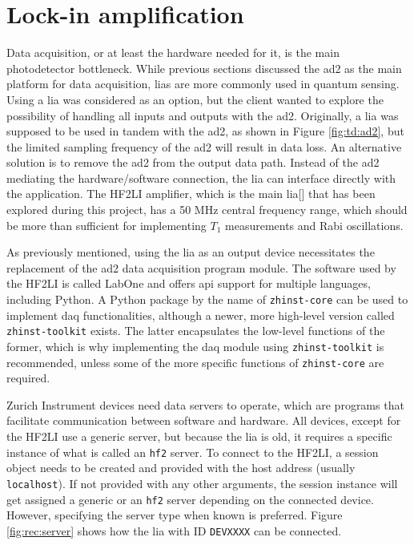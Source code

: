 \section{Lock-in amplification}
Data acquisition, or at least the hardware needed for it, is the main photodetector bottleneck. While previous sections discussed the \gls{ad2} as the main platform for data acquisition, \glspl{lia} are more commonly used in quantum sensing. Using a \gls{lia} was considered as an option, but the client wanted to explore the possibility of handling all inputs and outputs with the \gls{ad2}. Originally, a \gls{lia} was supposed to be used in tandem with the \gls{ad2}, as shown in Figure \ref{fig:td:ad2}, but the limited sampling frequency of the \gls{ad2} will result in data loss. An alternative solution is to remove the \gls{ad2} from the output data path. Instead of the \gls{ad2} mediating the hardware/software connection, the \gls{lia} can interface directly with the application. The HF2LI amplifier, which is the main \gls{lia}[] that has been explored during this project, has a 50 \unit[]{\mega\hertz} central frequency range, which should be more than sufficient for implementing $T_1$ measurements and Rabi oscillations. 





As previously mentioned, using the \gls{lia} as an output device necessitates the replacement of the \gls{ad2} data acquisition program module. The software used by the HF2LI is called LabOne and offers \gls{api} support for multiple languages, including Python. A Python package by the name of \lstinline|zhinst-core| can be used to implement \gls{daq} functionalities, although a newer, more high-level version called \lstinline|zhinst-toolkit| exists. The latter encapsulates the low-level functions of the former, which is why implementing the \gls{daq} module using \lstinline|zhinst-toolkit| is recommended, unless some of the more specific functions of \lstinline|zhinst-core| are required.

Zurich Instrument devices need data servers to operate, which are programs that facilitate communication between software and hardware. All devices, except for the HF2LI use a generic server, but because the \gls{lia} is old, it requires a specific instance of what is called an \lstinline|hf2| server. To connect to the HF2LI, a session object needs to be created and provided with the host address (usually \lstinline|localhost|). If not provided with any other arguments, the session instance will get assigned a generic or an \lstinline|hf2| server depending on the connected device. However, specifying the server type when known is preferred. Figure \ref{fig:rec:server} shows how the \gls{lia} with ID \lstinline|DEVXXXX| can be connected.



